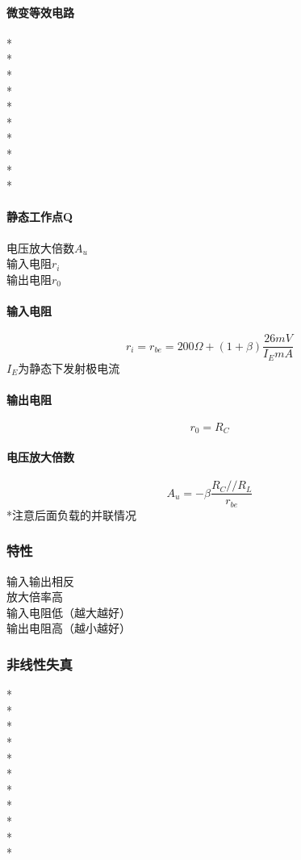 \documentclass[UTF8, fontset=none]{ctexart}
\begin{document}
\begin{multicols*}{8}
\paragraph{微变等效电路}%
*\\
*\\
*\\
*\\
*\\
*\\
*\\
*\\
*\\
*
\paragraph{静态工作点Q}
电压放大倍数$A_u$\\
输入电阻$r_i$\\
输出电阻$r_0$
\paragraph{输入电阻}
\[r_i = r_{be} = 200\Omega + (1 + \beta)\frac{26 mV}{I_E mA}\]
$I_E$为静态下发射极电流
\paragraph{输出电阻}
\[r_0 = R_{C}\]
\paragraph{电压放大倍数}
\[A_u = -\beta \frac{R_C//R_L}{r_{be}}\]
*注意后面负载的并联情况\\
\subsubsection{特性}
输入输出相反\\
放大倍率高\\
输入电阻低（越大越好）\\
输出电阻高（越小越好）
\subsubsection{非线性失真}%
*\\
*\\
*\\
*\\
*\\
*\\
*\\
*\\
*\\
*\\
*

\end{multicols*}
\end{document}
